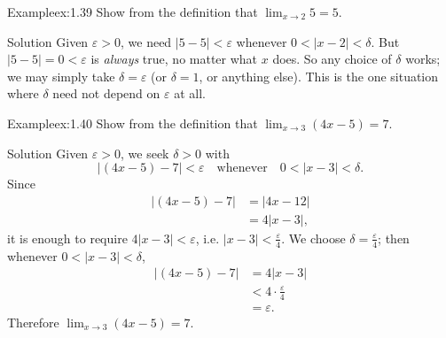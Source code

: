 \documentclass[a4paper,12pt,oneside]{memoir}
\begin{document}
\begin{workedexample}
\begin{envexample}{Example}{ex:1.39}{}
Show from the definition that \(\lim_{x \to 2} 5 = 5\).
\end{envexample}
\begin{envsolution}{Solution}{}{}
Given \(\varepsilon > 0\), we need \(|5 - 5| < \varepsilon\) whenever \(0 < |x - 2| < \delta\). But \(|5 - 5| = 0 < \varepsilon\) is \emph{always} true, no matter what \(x\) does. So any choice of \(\delta\) works; we may simply take \(\delta = \varepsilon\) (or \(\delta = 1\), or anything else). This is the one situation where \(\delta\) need not depend on \(\varepsilon\) at all.
\end{envsolution}
\end{workedexample}
\begin{workedexample}
\begin{envexample}{Example}{ex:1.40}{}
Show from the definition that \(\lim_{x \to 3} (4x - 5) = 7\).
\end{envexample}
\begin{envsolution}{Solution}{}{}
Given \(\varepsilon > 0\), we seek \(\delta > 0\) with \[ |(4x - 5) - 7| < \varepsilon \quad \text{whenever} \quad 0 < |x - 3| < \delta. \] Since \[ \begin{aligned} |(4x - 5) - 7| &= |4x - 12|\\ &= 4 |x - 3|, \end{aligned} \] it is enough to require \(4 |x - 3| < \varepsilon\), i.e. \(|x - 3| < \tfrac{\varepsilon}{4}\). We choose \(\delta = \tfrac{\varepsilon}{4}\); then whenever \(0 < |x - 3| < \delta\), \[ \begin{aligned} |(4x - 5) - 7| &= 4 |x - 3|\\ &< 4 \cdot \tfrac{\varepsilon}{4}\\ &= \varepsilon. \end{aligned} \] Therefore \(\lim_{x \to 3} (4x - 5) = 7\).
\end{envsolution}
\end{workedexample}
\end{document}
